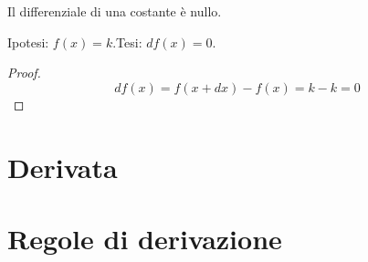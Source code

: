\begin{teorema}
Il differenziale di una costante è nullo.
\end{teorema}

\noindent Ipotesi: \(f(x)=k\).\tab Tesi: \(df(x)=0\).

\begin{proof}
\[
 df(x)=f(x+dx)-f(x)=k-k=0
\]
\end{proof}


% 
% 
 
\section{Derivata}
\label{sec:02_logaritmiche}


\section{Regole di derivazione}
\label{sec:02_logaritmiche}

